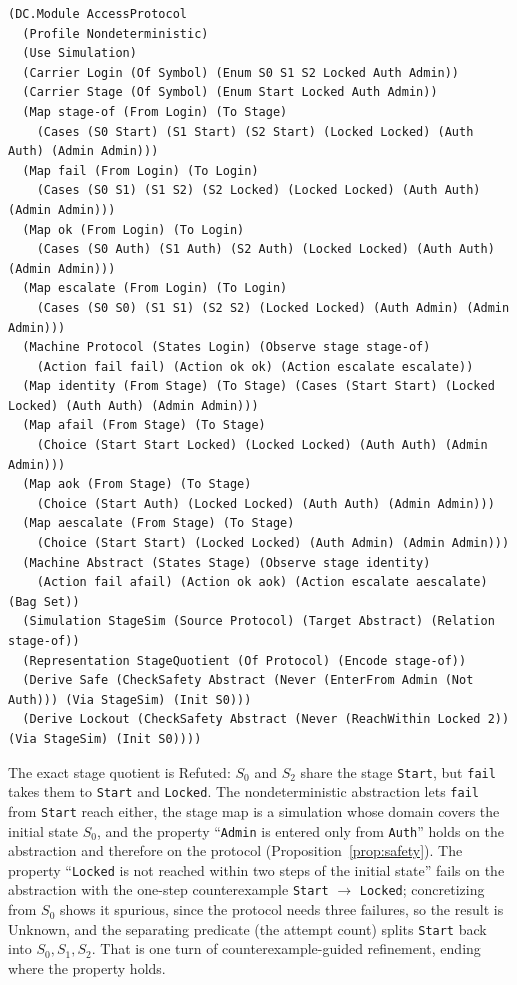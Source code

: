 \documentclass[11pt]{article}
\newcommand{\code}[1]{\texttt{#1}}
\theoremstyle{definition}
\theoremstyle{plain}
\begin{document}
\begin{lstlisting}[basicstyle=\ttfamily\footnotesize,title={\scriptsize\ttfamily fixtures/access\_protocol.metta}]
(DC.Module AccessProtocol
  (Profile Nondeterministic)
  (Use Simulation)
  (Carrier Login (Of Symbol) (Enum S0 S1 S2 Locked Auth Admin))
  (Carrier Stage (Of Symbol) (Enum Start Locked Auth Admin))
  (Map stage-of (From Login) (To Stage)
    (Cases (S0 Start) (S1 Start) (S2 Start) (Locked Locked) (Auth Auth) (Admin Admin)))
  (Map fail (From Login) (To Login)
    (Cases (S0 S1) (S1 S2) (S2 Locked) (Locked Locked) (Auth Auth) (Admin Admin)))
  (Map ok (From Login) (To Login)
    (Cases (S0 Auth) (S1 Auth) (S2 Auth) (Locked Locked) (Auth Auth) (Admin Admin)))
  (Map escalate (From Login) (To Login)
    (Cases (S0 S0) (S1 S1) (S2 S2) (Locked Locked) (Auth Admin) (Admin Admin)))
  (Machine Protocol (States Login) (Observe stage stage-of)
    (Action fail fail) (Action ok ok) (Action escalate escalate))
  (Map identity (From Stage) (To Stage) (Cases (Start Start) (Locked Locked) (Auth Auth) (Admin Admin)))
  (Map afail (From Stage) (To Stage)
    (Choice (Start Start Locked) (Locked Locked) (Auth Auth) (Admin Admin)))
  (Map aok (From Stage) (To Stage)
    (Choice (Start Auth) (Locked Locked) (Auth Auth) (Admin Admin)))
  (Map aescalate (From Stage) (To Stage)
    (Choice (Start Start) (Locked Locked) (Auth Admin) (Admin Admin)))
  (Machine Abstract (States Stage) (Observe stage identity)
    (Action fail afail) (Action ok aok) (Action escalate aescalate) (Bag Set))
  (Simulation StageSim (Source Protocol) (Target Abstract) (Relation stage-of))
  (Representation StageQuotient (Of Protocol) (Encode stage-of))
  (Derive Safe (CheckSafety Abstract (Never (EnterFrom Admin (Not Auth))) (Via StageSim) (Init S0)))
  (Derive Lockout (CheckSafety Abstract (Never (ReachWithin Locked 2)) (Via StageSim) (Init S0))))
\end{lstlisting}

The exact stage quotient is Refuted: $S_0$ and $S_2$ share the stage \code{Start}, but \code{fail}
takes them to \code{Start} and \code{Locked}. The nondeterministic abstraction lets \code{fail} from
\code{Start} reach either, the stage map is a simulation whose domain covers the initial state
$S_0$, and the property ``\code{Admin} is entered only from \code{Auth}'' holds on the abstraction
and therefore on the protocol (Proposition~\ref{prop:safety}). The property ``\code{Locked} is not
reached within two steps of the initial state'' fails on the abstraction with the one-step counterexample \code{Start}
$\to$ \code{Locked}; concretizing from $S_0$ shows it spurious, since the protocol needs three
failures, so the result is Unknown, and the separating predicate (the attempt count) splits
\code{Start} back into $S_0,S_1,S_2$. That is one turn of counterexample-guided refinement, ending
where the property holds.
\end{document}
